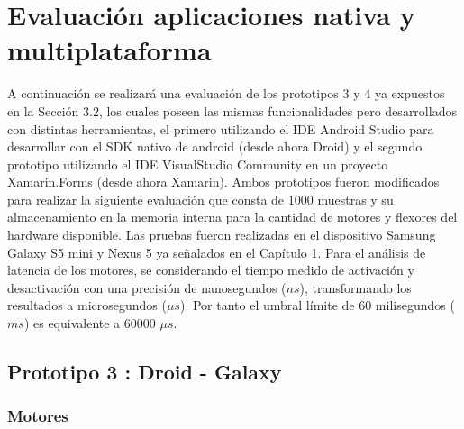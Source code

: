 \section{Evaluación aplicaciones nativa y multiplataforma}

A continuación se realizará una evaluación de los prototipos 3 y 4 ya expuestos en la Sección 3.2, los cuales poseen las mismas funcionalidades pero desarrollados con distintas herramientas, el primero utilizando el IDE Android Studio para desarrollar con el SDK nativo de android (desde ahora Droid) y el segundo prototipo utilizando el IDE VisualStudio Community en un proyecto Xamarin.Forms (desde ahora Xamarin). Ambos prototipos fueron modificados para realizar la siguiente evaluación que consta de 1000 muestras y su almacenamiento en la memoria interna para la cantidad de motores y flexores del hardware disponible. Las pruebas fueron realizadas en el dispositivo Samsung Galaxy S5 mini y Nexus 5 ya señalados en el Capítulo 1. Para el análisis de latencia de los motores, se considerando el tiempo medido de activación y desactivación con una precisión de nanosegundos ($ns$), transformando los resultados a microsegundos ($\mu s$).  Por tanto el umbral límite de 60 milisegundos ($ms$) es equivalente a 60000 $\mu s$.

\subsection{Prototipo 3 : Droid - Galaxy}

\subsubsection{Motores}



